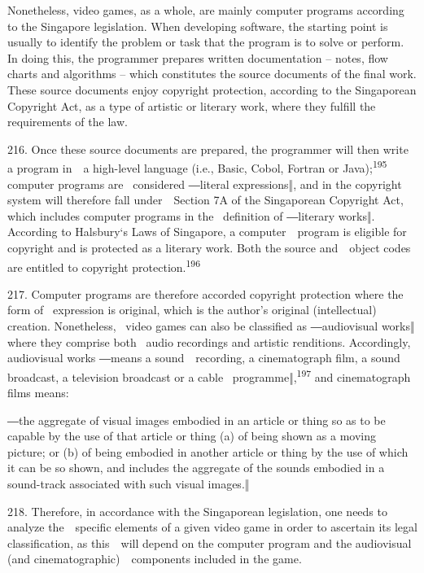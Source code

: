\documentclass[
]{article}
\begin{document}
{Nonetheless, video games, as a whole, are mainly computer programs
according to the Singapore legislation. When developing software, the
starting point is usually to identify the problem or task that the
program is to solve or perform. In doing this, the programmer prepares
written documentation }{-- }{notes, flow charts and algorithms }{--
}{which constitutes the source documents of the final work. These source
documents enjoy copyright protection, according to the Singaporean
}{Copyright Act}{, as a type of artistic or literary work, where they
fulfill the requirements of the law.}

{216. }{Once these source documents are prepared, the programmer will
then write a program in~~a high-level language (i.e., Basic, Cobol,
Fortran or Java);}\textsuperscript{{195 }}{computer programs are
}{~considered ―}{literal expressions}{‖, and in the copyright }{system
will therefore fall under~~Section 7A of the Singaporean }{Copyright
Act}{, which includes computer programs in the }{~definition of
―}{literary works‖}{. }{According to }{Halsbury`s Laws of Singapore}{, a
computer~~program is eligible for copyright and is protected as a
literary work. Both the source and~~object codes are entitled to
copyright protection.}\textsuperscript{{196 }}

{217. }{Computer programs are therefore accorded copyright protection
where the form of }{~expression is original, which is the author's
original (intellectual) creation}{. Nonetheless, }{~video games can also
be classified as ―audiovisual works‖ where they comprise both }{~audio
recordings and artistic renditions. }{Accordingly, audiovisual works
―}{means a sound~~recording, a cinematograph film, a sound broadcast, a
television broadcast or a cable }{~programme‖,}\textsuperscript{{197
}}{and cinematograph films means:}

{―}{the aggregate of visual images embodied in an article or thing so as
to be capable by the use of that article or thing (a) of being shown as
a moving picture; or (b) of being embodied in another article or thing
by the use of which it can be so shown, and includes the aggregate of
the sounds embodied in a sound-track associated with such visual
images}{.‖}

{218. }{Therefore, in accordance with the Singaporean legislation, one
needs to analyze the~~specific elements of a given video game in order
to ascertain its legal classification, as this~~will depend on the
computer program and the audiovisual (and cinematographic)~~components
included in the game.}
\end{document}
